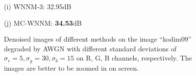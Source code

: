 \documentclass[10pt,onecolumn,letterpaper]{article}
\begin{document}
\begin{figure}[!htbp]
{\begin{minipage}[t]{0.25\textwidth}
{\footnotesize (i) WNNM-3: 32.95dB }
\end{minipage}
\begin{minipage}[t]{0.25\textwidth}
\centering
{}
{\footnotesize (j) MC-WNNM: \textbf{34.53}dB}
\end{minipage}
}
\caption{Denoised images of different methods on the image ``kodim09'' degraded by AWGN with different standard deviations of $\sigma_{r}=5, \sigma_{g}=30, \sigma_{b}=15$ on R, G, B channels, respectively. The images are better to be zoomed in on screen.}
\label{f5}
\end{figure}
\end{document}
